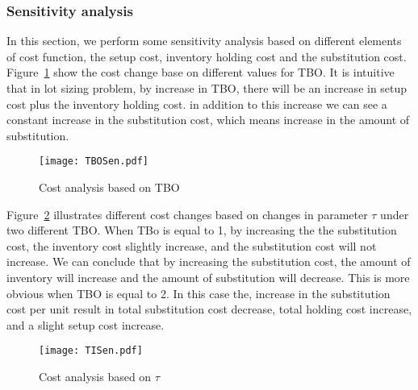 \documentclass[10pt]{article}
\begin{document}
\subsubsection{Sensitivity analysis}
In this section, we perform some sensitivity analysis based on different elements of cost function, the setup cost, inventory holding cost and the substitution cost. 
Figure~\ref{fig:TBOSen} show the cost change base on different values for TBO. It is intuitive that in lot sizing problem, by increase in TBO, there will be an increase in setup cost plus the inventory holding cost. in addition to this increase we can see a constant increase in the substitution cost, which means increase in the amount of substitution. 

\begin{figure}[!h]
\begin{center}
\texttt{[image: TBOSen.pdf]}
\caption{Cost analysis based on TBO} 
\label{fig:TBOSen}
\end{center}
\end{figure}

Figure~\ref{fig:TISen} illustrates different cost changes based on changes in parameter $\tau$ under two different TBO. When TBo is equal to 1, by increasing the the substitution cost, the inventory cost slightly increase, and the substitution cost will not increase. We can conclude that by increasing the substitution cost, the amount of inventory will increase and the amount of substitution will decrease. This is more obvious when TBO is equal to 2. In this case the, increase in the substitution cost per unit result in total substitution cost decrease, total holding cost increase, and a slight setup cost increase.  

\begin{figure}[H]
\begin{center}
\texttt{[image: TISen.pdf]}
\caption{Cost analysis based on $\tau$} 
\label{fig:TISen}
\end{center}
\end{figure}
\end{document}
